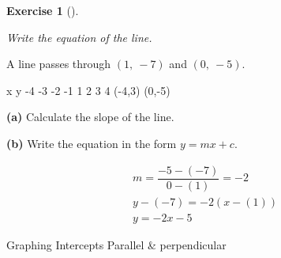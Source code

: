 \documentclass[
  letterpaper,
  DIV=11,
  numbers=noendperiod]{scrreprt}
\theoremstyle{definition}
\newtheorem{exercise}{Exercise}[chapter]
\theoremstyle{remark}
\begin{document}
\begin{exercise}[]\protect\hypertarget{exr-u7-14}{}\label{exr-u7-14}

\emph{Write the equation of the line.}

A line passes through \((1,\ -7)\) and \((0,\ -5)\).

x y -4 -3 -2 -1 1 2 3 4 (-4,3) (0,-5)

\textbf{(a)} Calculate the slope of the line.

\textbf{(b)} Write the equation in the form \(y = mx + c\).

\begin{tcolorbox}[enhanced jigsaw, opacitybacktitle=0.6, coltitle=black, arc=.35mm, colframe=quarto-callout-tip-color-frame, colback=white, bottomrule=.15mm, left=2mm, colbacktitle=quarto-callout-tip-color!10!white, titlerule=0mm, opacityback=0, title=\textcolor{quarto-callout-tip-color}{\faLightbulb}\hspace{0.5em}{🔍 View Solution}, leftrule=.75mm, breakable, rightrule=.15mm, bottomtitle=1mm, toptitle=1mm, toprule=.15mm]

\[
\begin{aligned}
m = \dfrac{-5 - (-7)}{0 - (1)} = -2 \\[4pt] y - (-7) = -2(x - (1)) \\[4pt] y = -2x - 5
\end{aligned}
\]

\end{tcolorbox}

{Graphing} {Intercepts} {Parallel \& perpendicular}

\end{exercise}
\end{document}
